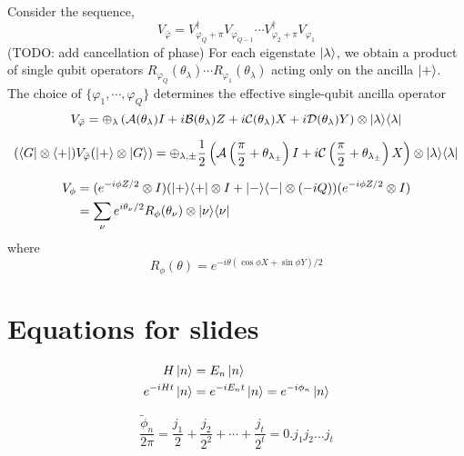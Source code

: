\documentclass[11pt, oneside]{article}   	%
\begin{document}
Consider the sequence,
\begin{equation*}
V_{\bar{\varphi}} = V^{\dagger}_{\varphi_Q+\pi} V_{\varphi_{Q-1}} \cdots V^{\dagger}_{\varphi_2+\pi} V_{\varphi_{1}}
\end{equation*}
(TODO: add cancellation of phase)
For each eigenstate $\ket{\lambda}$, we obtain a product of single qubit operators 
$R_{\varphi_Q} (\theta_{\lambda}) \cdots R_{\varphi_1} (\theta_{\lambda})$
acting only on the ancilla $\ket{+}$.
The choice of $\{\varphi_1, \cdots, \varphi_Q \}$ determines the effective single-qubit ancilla operator
\begin{equation*}
V_{\bar{\varphi}} = \oplus_{\lambda} \left( \mathcal{A}(\theta_{\lambda}) I + i \mathcal{B}(\theta_{\lambda}) Z + i \mathcal{C}(\theta_{\lambda}) X + i \mathcal{D}(\theta_{\lambda}) Y \right) \otimes \ket{\lambda} \! \bra{\lambda}
\end{equation*}

\begin{equation*}
(\bra{G} \otimes \bra{+}) V_{\bar{\varphi}} (\ket{+} \otimes \ket{G}) = \oplus_{\lambda, \pm} 
\frac{1}{2} \left( \mathcal{A} \left( \frac{\pi}{2} + \theta_{\lambda_{\pm}} \right) I + i \mathcal{C} \left(\frac{\pi}{2} + \theta_{\lambda_{\pm}} \right) X \right) \otimes \ket{\lambda} \! \bra{\lambda}
\end{equation*}

\begin{align*} 
V_{\phi} 
&= (e^{-i \phi Z/2} \otimes I) (\ket{+} \! \bra{+} \otimes I +  \ket{-} \! \bra{-} \otimes (-iQ)) (e^{-i \phi Z/2} \otimes I) \\
&= \sum_{\nu} e^{i \theta_{\nu}/2} R_{\phi} (\theta_{\nu}) \otimes \ket{\nu} \! \bra{\nu}
\end{align*}
where 
\begin{equation*}
R_{\phi} (\theta) = e^{-i \theta (\cos\phi X + \sin\phi Y)/2} 
\end{equation*}

\section{Equations for slides}
\begin{align*} 
H \ket{n} &= E_n  \ket{n} \\
e^{-i H t} \ket{n} &= e^{-i E_n t} \ket{n} = e^{-i \phi_n} \ket{n}
\end{align*}

\begin{equation*}
\frac{\tilde{\phi}_n}{2 \pi} = \frac{j_1}{2} + \frac{j_2}{2^2} + \cdots + \frac{j_t}{2^t} = 0.j_1 j_2 \dots j_t
\end{equation*}
\end{document}
